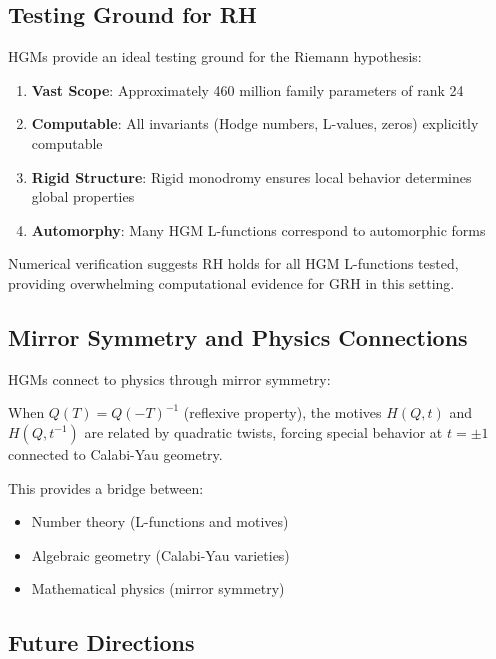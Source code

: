 \subsection{Testing Ground for RH}

HGMs provide an ideal testing ground for the Riemann hypothesis:

\begin{enumerate}
\item \textbf{Vast Scope}: Approximately 460 million family parameters of rank 24
\item \textbf{Computable}: All invariants (Hodge numbers, L-values, zeros) explicitly computable
\item \textbf{Rigid Structure}: Rigid monodromy ensures local behavior determines global properties
\item \textbf{Automorphy}: Many HGM L-functions correspond to automorphic forms
\end{enumerate}

\begin{remark}
Numerical verification suggests RH holds for all HGM L-functions tested, providing overwhelming computational evidence for GRH in this setting.
\end{remark}

\subsection{Mirror Symmetry and Physics Connections}

HGMs connect to physics through mirror symmetry:

\begin{theorem}
\label{thm:reflexive_hgm}
When $Q(T) = Q(-T)^{-1}$ (reflexive property), the motives $H(Q,t)$ and $H(Q,t^{-1})$ are related by quadratic twists, forcing special behavior at $t = \pm 1$ connected to Calabi-Yau geometry.
\end{theorem}

This provides a bridge between:
\begin{itemize}
\item Number theory (L-functions and motives)
\item Algebraic geometry (Calabi-Yau varieties)
\item Mathematical physics (mirror symmetry)
\end{itemize}

\subsection{Future Directions}

